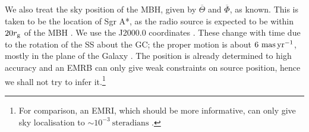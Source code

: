 We also treat the sky position of the MBH, given by $\overline{\Theta}$ and $\overline{\Phi}$, as known. This is taken to be the location of Sgr A*, as the radio source is expected to be within $20 r_\mathrm{g}$ of the MBH \citep{Reid2003,Doeleman2008}. We use the J2000.0 coordinates \citep{Reid1999, Yusef-Zadeh1999}. These change with time due to the rotation of the SS about the GC; the proper motion is about $6~\mathrm{mas\,yr^{-1}}$, mostly in the plane of the Galaxy \citep{Reid1999, Backer1999, Reid2003}. The position is already determined to high accuracy and an EMRB can only give weak constraints on source position, hence we shall not try to infer it.\footnote{For comparison, an EMRI, which should be more informative, can only give sky localisation to $\sim 10^{-3}~\mathrm{steradians}$ \citep{Barack2004, Huerta2009}.}

